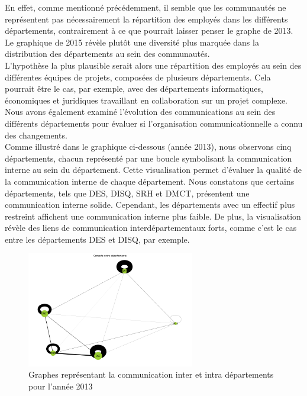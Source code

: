 \documentclass{article}
\begin{document}
En effet, comme mentionné précédemment, il semble que les communautés ne représentent pas nécessairement la répartition des employés dans les différents départements, contrairement à ce que pourrait laisser penser le graphe de 2013. Le graphique de 2015 révèle plutôt une diversité plus marquée dans la distribution des départements au sein des communautés. \\

L'hypothèse la plus plausible serait alors une répartition des employés au sein des différentes équipes de projets, composées de plusieurs départements. Cela pourrait être le cas, par exemple, avec des départements informatiques, économiques et juridiques travaillant en collaboration sur un projet complexe. \\

Nous avons également examiné l'évolution des communications au sein des différents départements pour évaluer si l'organisation communicationnelle a connu des changements. \\

Comme illustré dans le graphique ci-dessous (année 2013), nous observons cinq départements, chacun représenté par une boucle symbolisant la communication interne au sein du département. Cette visualisation permet d'évaluer la qualité de la communication interne de chaque département. Nous constatons que certains départements, tels que DES, DISQ, SRH et DMCT, présentent une communication interne solide. Cependant, les départements avec un effectif plus restreint affichent une communication interne plus faible. De plus, la visualisation révèle des liens de communication interdépartementaux forts, comme c'est le cas entre les départements DES et DISQ, par exemple.

\begin{figure}[!h]
    \centering
    \includegraphics[width=0.65\textwidth]{assets/communaute/communaute_communication_2013.png}
    \caption{Graphes représentant la communication inter et intra départements pour l'année 2013}
    \label{fig:communaute_communication_2013}
\end{figure}
\end{document}
